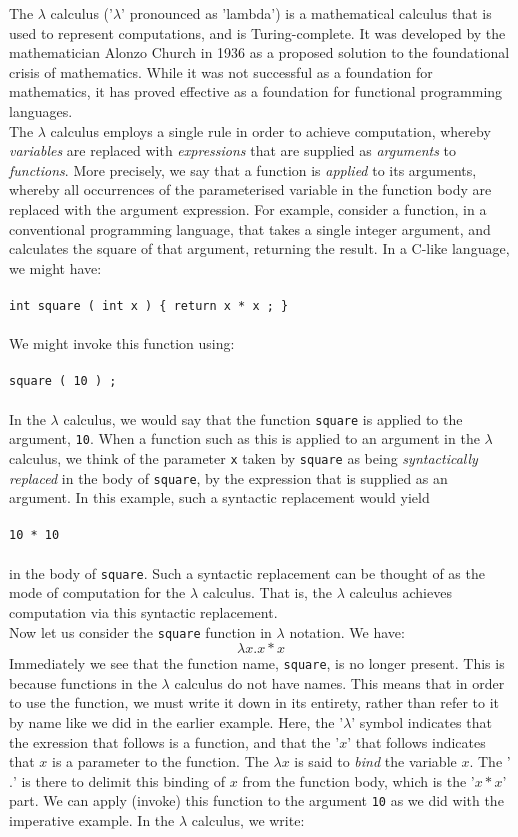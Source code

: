 \documentclass{article}
\begin{document}
The $\lambda$ calculus ('$\lambda$' pronounced as 'lambda') is a mathematical calculus that is used to represent computations, and is Turing-complete. It was developed by the mathematician Alonzo Church in 1936 as a proposed solution to the foundational crisis of mathematics. While it was not successful as a foundation for mathematics, it has proved effective as a foundation for functional programming languages.
\\
\indent The $\lambda$ calculus employs a single rule in order to achieve computation, whereby \emph{variables} are replaced with \emph{expressions} that are supplied as \emph{arguments} to \emph{functions}. More precisely, we say that a function is \emph{applied} to its arguments, whereby all occurrences of the parameterised variable in the function body are replaced with the argument expression. For example, consider a function, in a conventional programming language, that takes a single integer argument, and calculates the square of that argument, returning the result. In a C-like language, we might have:
\\\\
\indent \texttt{int square ( int x ) \{ return x * x ; \}}
\\\\
We might invoke this function using:
\\\\
\indent \texttt{square ( 10 ) ;}
\\\\
In the $\lambda$ calculus, we would say that the function \texttt{square} is applied to the argument, \texttt{10}. When a function such as this is applied to an argument in the $\lambda$ calculus, we think of the parameter \texttt{x} taken by \texttt{square} as being \emph{syntactically replaced} in the body of \texttt{square}, by the expression that is supplied as an argument. In this example, such a syntactic replacement would yield
\\\\
\indent \texttt{10 * 10}
\\\\
in the body of \texttt{square}. Such a syntactic replacement can be thought of as the mode of computation for the $\lambda$ calculus. That is, the $\lambda$ calculus achieves computation via this syntactic replacement.
\\
\indent Now let us consider the \texttt{square} function in $\lambda$ notation. We have:
\[ \lambda x.x * x \]
Immediately we see that the function name, \texttt{square}, is no longer present. This is because functions in the $\lambda$ calculus do not have names. This means that in order to use the function, we must write it down in its entirety, rather than refer to it by name like we did in the earlier example. Here, the '$\lambda$' symbol indicates that the exression that follows is a function, and that the '$x$' that follows indicates that $x$ is a parameter to the function. The $\lambda x$ is said to \emph{bind} the variable $x$. The '$.$' is there to delimit this binding of $x$ from the function body, which is the '$x * x$' part. We can apply (invoke) this function to the argument \texttt{10} as we did with the imperative example. In the $\lambda$ calculus, we write:
\end{document}
